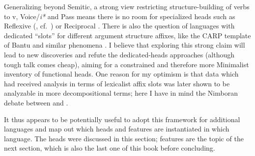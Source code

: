 \label{r1:6:5}Generalizing beyond Semitic, a strong view restricting structure-building of verbs to v, Voice/\textit{i*} and Pass means there is no room for specialized heads such as Reflexive (\citealt{ahn15phd}, cf.~\citealt{spathas17camvoice,spathas17debrecen}) or Reciprocal \citep{bruening04}. There is also the question of languages with dedicated ``slots'' for different argument structure affixes, like the CARP template of Bantu and similar phenomena \citep{hyman03,paster05}. I believe that exploring this strong claim will lead to new discoveries and refute the dedicated-heads approaches (although tough talk comes cheap), aiming for a constrained and therefore more Minimalist inventory of functional heads. One reason for my optimism is that data which had received analysis in terms of lexicalist affix slots was later shown to be analyzable in more decompositional terms; here I have in mind the Nimboran debate between \cite{inkelas93} and \cite{noyer98}.

It thus appears to be potentially useful to adopt this framework for additional languages and map out which heads and features are instantiated in which language. The heads were discussed in this section; features are the topic of the next section, which is also the last one of this book before concluding.


